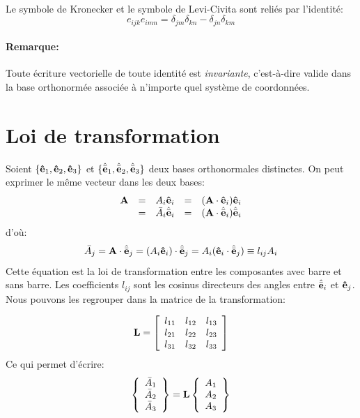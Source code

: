 \paragraph{} Le symbole de Kronecker et le symbole de Levi-Civita sont reliés par l'identité:
$$e_{ijk}e_{imn}=\delta_{jm}\delta_{kn}-\delta_{jn}\delta_{km}$$

\paragraph{Remarque:} Toute écriture vectorielle de toute identité est \emph{invariante}, c'est-à-dire valide dans la base orthonormée associée à n'importe quel système de coordonnées.

\section{Loi de transformation}
Soient $\{\textbf{ê}_1, \textbf{ê}_2, \textbf{ê}_3\}$ et $\{\hat{\bar{\textbf{e}}}_1, \hat{\bar{\textbf{e}}}_2, \hat{\bar{\textbf{e}}}_3\}$ deux bases orthonormales distinctes. On peut exprimer le même vecteur dans les deux bases:
$$\begin{array}{c c c c c}
\textbf{A} &=& A_i\textbf{ê}_i &=& (\textbf{A}\cdot \textbf{ê}_i)\textbf{ê}_i\\
 &=& \bar{A}_i\hat{\bar{\textbf{e}}}_i &=& (\textbf{A}\cdot \hat{\bar{\textbf{e}}}_i)\hat{\bar{\textbf{e}}}_i\\
\end{array}$$
d'où:  $$\bar{A}_j=\textbf{A}\cdot\hat{\bar{\textbf{e}}}_j=(A_i\textbf{ê}_i)\cdot\hat{\bar{\textbf{e}}}_j=A_i(\textbf{ê}_i\cdot\hat{\bar{\textbf{e}}}_j)\equiv l_{ij}A_i$$
Cette équation est la loi de transformation entre les composantes avec barre et sans barre. Les coefficients $l_{ij}$ sont les cosinus directeurs des angles entre $\hat{\bar{\textbf{e}}}_i$ et $\textbf{ê}_j$. Nous pouvons les regrouper dans la matrice  de la transformation:

$$\textbf{L}= \left[
\begin{array}{c c c}
l_{11}& l_{12}& l_{13} \\
l_{21}& l_{22}& l_{23}\\
l_{31}& l_{32}& l_{33}\\
\end{array}\right]$$
Ce qui permet d'écrire:
$$\left\{
\begin{array}{c}
\bar{A}_1\\
\bar{A}_2\\
\bar{A}_3
\end{array}\right\} = \textbf{L} \left\{\begin{array}{c}
A_1\\
A_2\\
A_3\\
\end{array}\right\}$$

